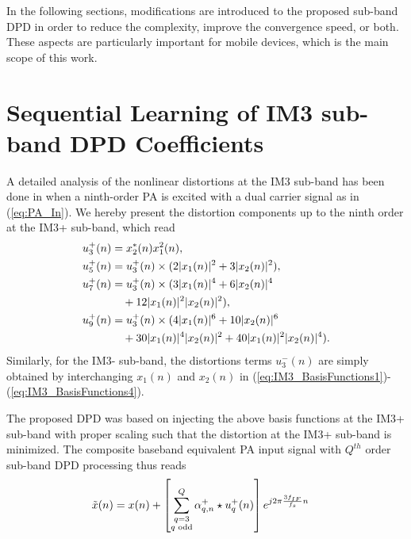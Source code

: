 \documentclass[9pt,conference]{IEEEtran}
\begin{document}
\begin{spacing}{0.88}
In the following sections, modifications are introduced to the proposed sub-band DPD in order to reduce the complexity, improve the convergence speed, or both. These aspects are particularly important for mobile devices, which is the main scope of this work.

\section{Sequential Learning of IM3 sub-band DPD Coefficients}
\label{sec:Sequential_Learning}
A detailed analysis of the nonlinear distortions at the IM3 sub-band has been done in \cite{TMTT_SubbandDPD} when a ninth-order PA is excited with a dual carrier signal as in (\ref{eq:PA_In}). We hereby present the distortion components up to the ninth order at the IM3+ sub-band, which read
\begin{align}
\small
u^+_3(n) &= x_2^*(n)x_1^2(n), \label{eq:IM3_BasisFunctions1}\\
u^+_5(n) &= u^+_3(n) \times (2 |x_1(n)|^2 + 3 |x_2(n)|^2),  \label{eq:IM3_BasisFunctions2}\\
u^+_7(n) &= u^+_3(n) \times (3 |x_1(n)|^4 + 6 |x_2(n)|^4 \nonumber\\
& \quad + 12 |x_1(n)|^2 |x_2(n)|^2) \label{eq:IM3_BasisFunctions3},\\
u^+_9(n) &= u^+_3(n) \times (4 |x_1(n)|^6 + 10|x_2(n)|^6 \nonumber\\
&\quad + 30 |x_1(n)|^4 |x_2(n)|^2 + 40 |x_1(n)|^2 |x_2(n)|^4). \label{eq:IM3_BasisFunctions4}
\end{align}
\normalsize
Similarly, for the IM3- sub-band, the distortions terms $u^-_3(n)$ are simply obtained by interchanging $x_1(n)$ and $x_2(n)$ in (\ref{eq:IM3_BasisFunctions1})-(\ref{eq:IM3_BasisFunctions4}).

The proposed DPD was based on injecting the above basis functions at the IM3+ sub-band with proper scaling such that the distortion at the IM3+ sub-band is minimized. The composite baseband equivalent PA input signal with $Q^{th}$ order sub-band DPD processing thus reads 
\begin{align}
\small
\tilde{x}(n) &=  x(n) + \left[\sum_{\substack{q=3 \\ q \text{ odd}}}^{Q} \alpha^+_{q,n} \star  u^+_q(n)\right]e^{j 2\pi \frac{3 f_{IF}}{f_s} n}
\label{eq:PA_In_with_IM3_DPD}
\end{align}
\normalsize


\end{spacing}
\end{document}
